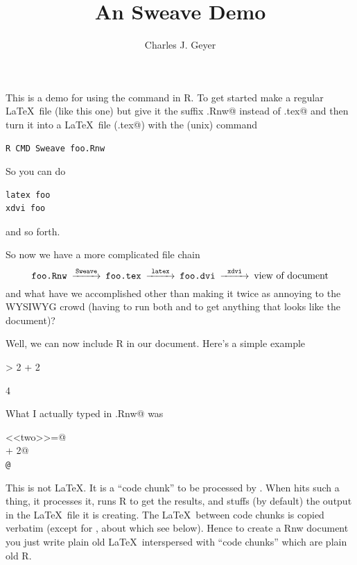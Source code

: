 \documentclass{article}
\begin{document}


\title{An Sweave Demo}
\author{Charles J. Geyer}
\maketitle

This is a demo for using the \verb@Sweave@ command in R.  To
get started make a regular \LaTeX\ file (like this one) but
give it the suffix \verb@.Rnw@ instead of \verb@.tex@ and then
turn it into a \LaTeX\ file (\verb@foo.tex@) with the (unix) command
\begin{verbatim}
R CMD Sweave foo.Rnw
\end{verbatim}
So you can do
\begin{verbatim}
latex foo
xdvi foo
\end{verbatim}
and so forth.

So now we have a more complicated file chain
$$
\begin{CD}
   \texttt{foo.Rnw}
   @>\texttt{Sweave}>>
   \texttt{foo.tex}
   @>\texttt{latex}>>
   \texttt{foo.dvi}
   @>\texttt{xdvi}>>
   \text{view of document}
\end{CD}
$$
and what have we accomplished other than making it twice as annoying
to the WYSIWYG crowd (having to run both \verb@Sweave@ and \verb@latex@
to get anything that looks like the document)?

Well, we can now include R in our document.  Here's a simple example
\begin{Schunk}
\begin{Sinput}
> 2 + 2
\end{Sinput}
\begin{Soutput}
[1] 4
\end{Soutput}
\end{Schunk}
What I actually typed in \verb@foo.Rnw@ was
\begin{tabbing}
\verb@<<two>>=@ \\
 + 2@ \\
\verb+@+ \\
\end{tabbing}
This is not \LaTeX.  It is a ``code chunk'' to be processed by \verb@Sweave@.
When \verb@Sweave@ hits such a thing, it processes it, runs R to get the
results, and stuffs (by default) the output in the \LaTeX\ file it is
creating.  The \LaTeX\ between code chunks is copied verbatim (except
for \verb@Sexpr@, about which see below).  Hence to create a Rnw document
you just write plain old \LaTeX\ interspersed with ``code chunks'' which
are plain old R.
\end{document}
